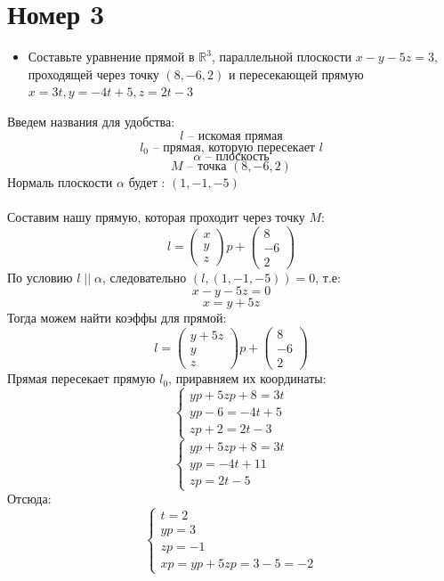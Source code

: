 \documentclass[a4paper,12pt]{article}
\begin{document}
\section*{Номер 3}
\begin{itemize}
\item
\begin{center}
Составьте уравнение прямой в $\mathbb{R}^3$, параллельной плоскости $x - y - 5z = 3$, проходящей через точку $(8, -6, 2)$ и пересекающей прямую $x = 3t, y = -4t + 5, z = 2t-3$
\end{center}
\end{itemize}
Введем названия для удобства:
\[
l \text{ -- искомая прямая}
\]
\[
l_0 \text{ -- прямая, которую пересекает } l
\]
\[
\alpha \text{ -- плоскость} 
\]
\[
M \text{ -- точка } (8, -6, 2)
\]
Нормаль плоскости $\alpha$ будет : $(1, -1, -5)$
\\\\
Составим нашу прямую, которая проходит через точку $M$:
\[
l = \begin{pmatrix}
x \\ y \\ z
\end{pmatrix}p + \begin{pmatrix}
8 \\ -6 \\ 2
\end{pmatrix}
\]
По условию $l \; ||  \; \alpha$, следовательно $(l, (1, -1, -5)) = 0$, т.е:
\[
x - y - 5z = 0
\]
\[
x = y + 5z
\]
Тогда можем найти коэффы для прямой:
\[
l = \begin{pmatrix}
y+ 5z \\ y\\ z
\end{pmatrix}p + \begin{pmatrix}
8 \\ -6 \\ 2
\end{pmatrix}
\]
Прямая пересекает прямую $l_0$, приравняем их координаты:
\[
\begin{cases}
yp + 5zp +8 = 3t \\
yp -6 = -4t + 5\\
zp +2 = 2t - 3
\end{cases}
\]
\[
\begin{cases}
yp + 5zp +8 = 3t \\
yp  = -4t + 11\\
zp  = 2t - 5
\end{cases}
\]
Отсюда:
\[
\begin{cases}
t = 2\\
yp = 3\\
z p = -1\\
xp = yp + 5zp = 3 - 5 = -2 
\end{cases}
\]
\end{document}
